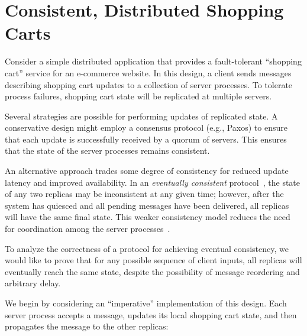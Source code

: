\section{Consistent, Distributed Shopping Carts}
\label{sec:motivation}

Consider a simple distributed application that provides a fault-tolerant
``shopping cart'' service for an e-commerce website. In this design, a client
sends messages describing shopping cart updates to a collection of server
processes. To tolerate process failures, shopping cart state will be replicated
at multiple servers.

Several strategies are possible for performing updates of replicated state. A
conservative design might employ a consensus protocol (e.g., Paxos\cite{part-time})
to ensure that each update is successfully received by a quorum of servers. This
ensures that the state of the server processes remains consistent.

An alternative approach trades some degree of consistency for reduced update
latency and improved availability. In an \emph{eventually consistent}
protocol~\cite{quicksand,beyond}, the state of any two replicas may be
inconsistent at any given time; however, after the system has quiesced and all
pending messages have been delivered, all replicas will have the same final
state. This weaker consistency model reduces the need for coordination among the
server processes~\cite{dynamo}.

To analyze the correctness of a protocol for achieving eventual consistency, we
would like to prove that for any possible sequence of client inputs, all
replicas will eventually reach the same state, despite the possibility of
message reordering and arbitrary delay.

We begin by considering an ``imperative'' implementation of this design. Each
server process accepts a message, updates its local shopping cart state, and
then propagates the message to the other replicas:


